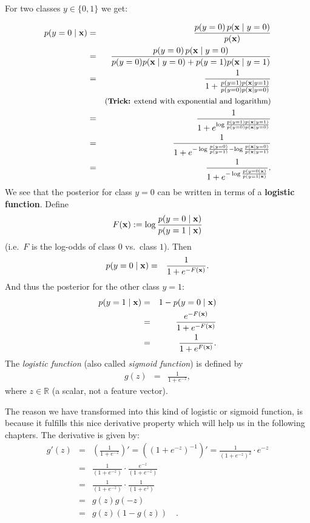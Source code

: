 For two classes $y\in\{0, 1\}$ we get:
  
  \begin{eqnarray*}
    p(y=0\mid \bm{\mathrm{x}})
      &=&  \frac{p(y=0)\, p(\bm{\mathrm{x}} \mid y=0)}{p(\bm{\mathrm{x}})} \\ 
      &=& \frac{p(y=0)\, p(\bm{\mathrm{x}} \mid y=0)}{p(y=0)p(\bm{\mathrm{x}} \mid y=0)+p(y=1)p(\bm{\mathrm{x}} \mid y=1)} \\
      &=& \frac{1}{1+\frac{p(y=1)p(\bm{\mathrm{x}}\mid y=1)}{p(y=0)p(\bm{\mathrm{x}}\mid y=0)}} \\
      &\phantom{=}& \mbox{\small (\textbf{Trick:} extend with exponential and logarithm)} \\ 
      &=& \frac{1}{1+e^{\log \frac{p(y=1)p(\bm{\mathrm{x}}\mid y=1)}{p(y=0)p(\bm{\mathrm{x}}\mid y=0)}}} \\
      &=& \frac{1}{1+e^{-\log\frac{p(y=0)}{p(y=1)} - \log\frac{p(\bm{\mathrm{x}}\mid y=0)}{p(\bm{\mathrm{x}}\mid y=1)}}}\\
      &=& \frac{1}{1+e^{-\log\frac{p(y=0\mid\bm{\mathrm{x}})}{p(y=1\mid\bm{\mathrm{x}})}}}.
  \end{eqnarray*}
 We see that the posterior for class $y = 0$ can be written in terms of a \textbf{logistic function}. Define
\begin{eqnarray*}
  F(\bm{\mathrm{x}}) := \log\frac{p(y=0\mid\bm{\mathrm{x}})}{p(y=1\mid\bm{\mathrm{x}})}
\end{eqnarray*}
(i.e.\ $F$ is the log-odds of class $0$ vs.\ class $1$). Then
 \begin{eqnarray*}
    p(y=0\mid \bm{\mathrm{x}}) &=& \frac{1}{1+e^{-F(\bm{\mathrm{x}})}}.
  \end{eqnarray*}
  And thus the posterior for the other class $y = 1$:
  \begin{eqnarray*}
    p(y=1\mid \bm{\mathrm{x}}) &=& 1- p(y=0\mid \bm{\mathrm{x}}) \\
                   &=& \frac{e^{-F(\bm{\mathrm{x}})}}{1+e^{-F(\bm{\mathrm{x}})}} \\
                   &=&  \frac{1}{1+e^{F(\bm{\mathrm{x}})}}.
  \end{eqnarray*}
The {\em logistic function} (also called {\em sigmoid function}) is defined by
    \begin{eqnarray*}
      g(z) &=& \frac{1}{1+e^{-z}},
    \end{eqnarray*}
    where $z\in \mathbb{R}$ (a scalar, not a feature vector).
    
The reason we have transformed into this kind of logistic or sigmoid function, is because it fulfills this nice derivative property which will help us in the following chapters. The derivative is given by:
  \begin{eqnarray*}
    g'(z) &=& \left( \frac{1}{1+e^{-z}} \right)' = \left( (1+e^{-z})^{-1}\right)'=  \frac{1}{(1+e^{-z})^2}\cdot e^{-z} \\ 
          &=& \frac{1}{(1+e^{-z})} \cdot \frac{e^{-z}}{(1+e^{-z})} \\
          &=& \frac{1}{(1+e^{-z})} \cdot \frac{1}{(1+e^{z})} \\
          &=& g(z)g(-z) \\
          &=& g(z)(1-g(z)) \quad.
  \end{eqnarray*}

